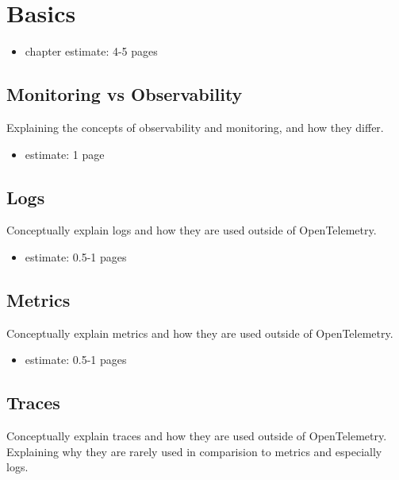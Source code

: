 \chapter{Basics}
\label{chap:basics}

\begin{itemize}
    \item chapter estimate: 4-5 pages
\end{itemize}

\section{Monitoring vs Observability}
\label{sec:b_monitoring_vs_observability}

Explaining the concepts of observability and monitoring, and how they differ.

\begin{itemize}
    \item estimate: 1 page
\end{itemize}

\section{Logs}
\label{sec_b_logs}

Conceptually explain logs and how they are used outside of OpenTelemetry.

\begin{itemize}
    \item estimate: 0.5-1 pages
\end{itemize}

\section{Metrics}
\label{sec_b_metrics}

Conceptually explain metrics and how they are used outside of OpenTelemetry.

\begin{itemize}
    \item estimate: 0.5-1 pages
\end{itemize}

\section{Traces}
\label{sec_b_traces}

Conceptually explain traces and how they are used outside of OpenTelemetry.
Explaining why they are rarely used in comparision to metrics and especially logs.

